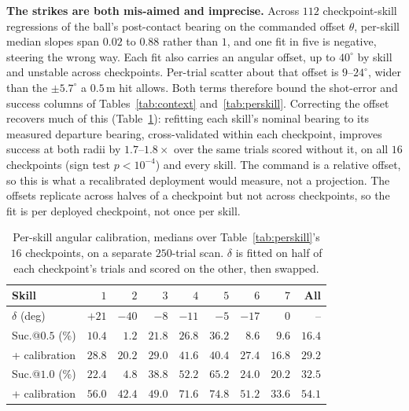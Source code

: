 \documentclass[letterpaper, 10 pt, conference]{ieeeconf}  %
\begin{document}
\textbf{The strikes are both mis-aimed and imprecise.} Across $112$
checkpoint-skill regressions of the ball's post-contact bearing on the
commanded offset $\theta$, per-skill median slopes span $0.02$ to $0.88$
rather than $1$, and one fit in five is negative, steering the wrong way. Each fit also carries an
angular offset, up to $40^\circ$ by skill and unstable across checkpoints.
Per-trial scatter about that offset is $9$--$24^\circ$, wider than the
$\pm5.7^\circ$ a $0.5$\,m hit allows. Both terms therefore bound the
shot-error and success columns of Tables~\ref{tab:context}
and~\ref{tab:perskill}.
Correcting the offset recovers much of this
(Table~\ref{tab:calib}): refitting each skill's nominal bearing to its
measured departure bearing, cross-validated within each checkpoint, improves
success at both radii by $1.7$--$1.8\times$ over the same trials scored
without it, on all $16$ checkpoints (sign test $p<10^{-4}$) and every skill. The command is a relative offset, so this is what a
recalibrated deployment would measure, not a projection. The offsets replicate across halves of a checkpoint but not across
checkpoints, so the fit is per deployed checkpoint, not once per skill.


\begin{table}[htbp]
\centering
\caption{Per-skill angular calibration, medians over Table~\ref{tab:perskill}'s
$16$ checkpoints, on a separate $250$-trial scan. $\delta$ is fitted on half
of each checkpoint's trials and scored on the other, then swapped.}
\label{tab:calib}
\scriptsize
\setlength{\tabcolsep}{3pt}
\begin{tabular}{@{}lrrrrrrrr@{}}
\toprule
Skill & $1$ & $2$ & $3$ & $4$ & $5$ & $6$ & $7$ & All \\
\midrule
$\delta$ (deg)        & $+21$ & $-40$ & $-8$ & $-11$ & $-5$ & $-17$ & $0$ & -- \\
\midrule
Suc.@$0.5$ (\%)       & $10.4$ & $1.2$ & $21.8$ & $26.8$ & $36.2$ & $8.6$ & $9.6$ & $16.4$ \\
\;\;+ calibration     & $\mathbf{28.8}$ & $\mathbf{20.2}$ & $\mathbf{29.0}$ & $\mathbf{41.6}$ & $\mathbf{40.4}$ & $\mathbf{27.4}$ & $\mathbf{16.8}$ & $\mathbf{29.2}$ \\
\midrule
Suc.@$1.0$ (\%)       & $22.4$ & $4.8$ & $38.8$ & $52.2$ & $65.2$ & $24.0$ & $20.2$ & $32.5$ \\
\;\;+ calibration     & $\mathbf{56.0}$ & $\mathbf{42.4}$ & $\mathbf{49.0}$ & $\mathbf{71.6}$ & $\mathbf{74.8}$ & $\mathbf{51.2}$ & $\mathbf{33.6}$ & $\mathbf{54.1}$ \\
\bottomrule
\end{tabular}
\end{table}
\end{document}

